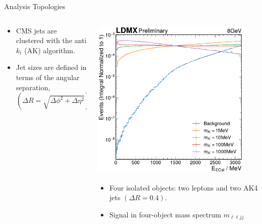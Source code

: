 \documentclass[aspectratio=169]{beamer}
\begin{document}
\begin{frame}[t]{Analysis Topologies}
  \begin{columns}[t]
    \begin{column}{0.32\textwidth}
      \centering
      \resizebox{0.99\linewidth}{!}{%
      }
      {
        \footnotesize
        \begin{itemize}
          \item CMS jets are clustered with the anti $k_t$ (AK) algorithm.
          \item Jet sizes are defined in terms of the angular separation, $\left(\Delta R = \sqrt{\Delta \phi^{2} + \Delta \eta^{2}}\right)$
        \end{itemize}
      }
    \end{column}
    \begin{column}{0.32\textwidth}
      \centering
      \includegraphics[width=0.9\textwidth]{../figures/ldmx/analysis/energy-after-trigger-8gev.pdf}
      {
        \footnotesize
        \begin{itemize}
          \item Four isolated objects: two leptons and two AK4 jets $\left(\Delta R = 0.4\right)$.
          \item Signal in four-object mass spectrum $m_{\ell \ell j j}$
        \end{itemize}
}
\end{column}
\end{columns}
\end{frame}
\end{document}
